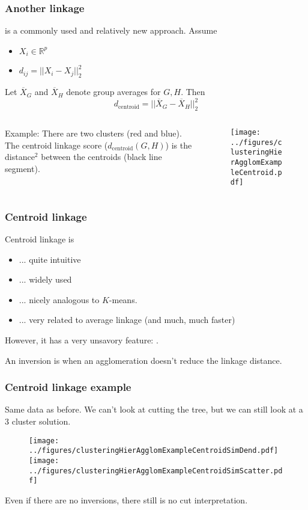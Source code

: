 \documentclass{beamer}
\begin{document}
\begin{frame}
\frametitle{Another linkage}
 is a commonly used and relatively new approach.  
Assume 
\begin{itemize}
\item $X_i \in \mathbb{R}^p$
\item $d_{ij} = ||X_i - X_j||_2^2$
\end{itemize}
\vsp

Let $\overline{X}_G$ and $\overline{X}_H$ denote group averages for $G,H$. Then
\[
d_{\textrm{centroid}} = ||\overline{X}_G - \overline{X}_H||_2^2
\]

\begin{columns}[T]
\begin{column}{.48\textwidth}
\vsp
\vsp
Example: There are two clusters (red and blue).  The centroid linkage
score ($d_{\textrm{centroid}}(G,H)$) is the distance$^2$ between the centroids (black line segment).
\end{column}
\begin{column}{.48\textwidth}
\begin{figure}[h!]
  \centering
  \texttt{[image: ../figures/clusteringHierAgglomExampleCentroid.pdf]}
\end{figure}
\end{column}
\end{columns}
\end{frame}

\begin{frame}
\frametitle{Centroid linkage}
Centroid linkage is
\begin{itemize}
\item  ... quite intuitive
\item ... widely used
\item ... nicely analogous to $K$-means.
\item ... very related to average linkage (and much, much faster)
\end{itemize}
However, it has a very unsavory feature: .

\vsp
An inversion is when an agglomeration doesn't reduce the linkage distance.
\end{frame}

\begin{frame}
\frametitle{Centroid linkage example}
Same data as before.  We can't look at cutting the tree, but we can still look at a 3 cluster solution.
\begin{figure}[h!]
  \centering
  \texttt{[image: ../figures/clusteringHierAgglomExampleCentroidSimDend.pdf]}
  \texttt{[image: ../figures/clusteringHierAgglomExampleCentroidSimScatter.pdf]}  
\end{figure}
 Even if there are no inversions, there still is no cut interpretation.

\end{frame}
\end{document}
